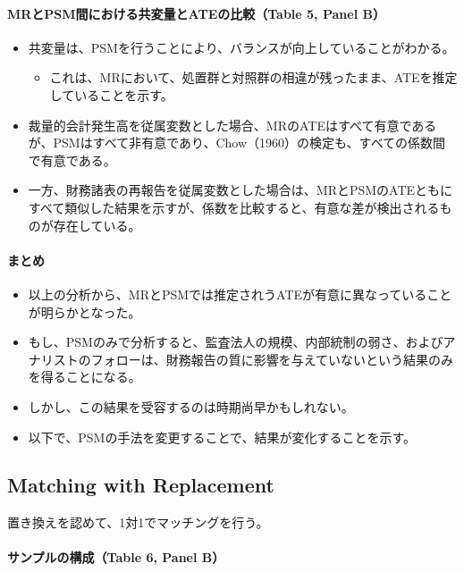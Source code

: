 \paragraph{MRとPSM間における共変量とATEの比較（Table 5, Panel B）}

\begin{itemize}
 \item 共変量は、PSMを行うことにより、バランスが向上していることがわかる。
  \begin{itemize}
   \item これは、MRにおいて、処置群と対照群の相違が残ったまま、ATEを推定していることを示す。
  \end{itemize}
 \item 裁量的会計発生高を従属変数とした場合、MRのATEはすべて有意であるが、PSMはすべて非有意であり、Chow（1960）の検定も、すべての係数間で有意である。
 \item 一方、財務諸表の再報告を従属変数とした場合は、MRとPSMのATEともにすべて類似した結果を示すが、係数を比較すると、有意な差が検出されるものが存在している。
\end{itemize}

\paragraph{まとめ}
\begin{itemize}
 \item 以上の分析から、MRとPSMでは推定されうATEが有意に異なっていることが明らかとなった。
 \item もし、PSMのみで分析すると、監査法人の規模、内部統制の弱さ、およびアナリストのフォローは、財務報告の質に影響を与えていないという結果のみを得ることになる。
 \item しかし、この結果を受容するのは時期尚早かもしれない。
 \item 以下で、PSMの手法を変更することで、結果が変化することを示す。
\end{itemize}

\subsection*{Matching with Replacement}

置き換えを認めて、1対1でマッチングを行う。

\paragraph{サンプルの構成（Table 6, Panel B）}

